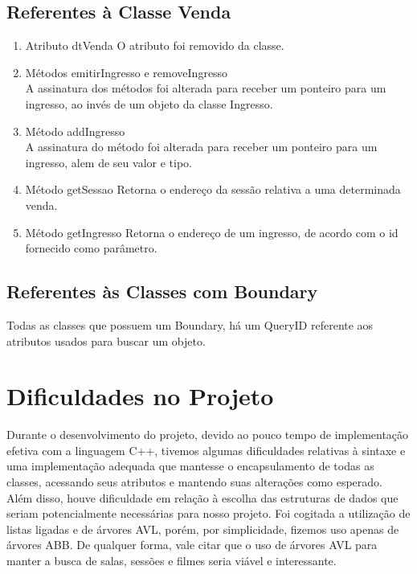 \documentclass[a4paper]{article}
\begin{document}
\subsection{Referentes à Classe Venda}
\begin{enumerate}

\item{Atributo dtVenda}
O atributo foi removido da classe.

\item{Métodos emitirIngresso e removeIngresso}\\
A assinatura dos métodos foi alterada para receber um ponteiro para um ingresso, ao invés de um objeto da classe Ingresso.

\item{Método addIngresso}\\
A assinatura do método foi alterada para receber um ponteiro para um ingresso, alem de seu valor e tipo.

\item{Método getSessao}
Retorna o endereço da sessão relativa a uma determinada venda.

\item{Método getIngresso}
Retorna o endereço de um ingresso, de acordo com o id fornecido como parâmetro.

\end{enumerate}

\subsection{Referentes às Classes com Boundary}
Todas as classes que possuem um Boundary, há um QueryID referente aos atributos usados para buscar um objeto.

\pagebreak

\section{Dificuldades no Projeto}
\hspace{5 mm}Durante o desenvolvimento do projeto, devido ao pouco tempo de implementação efetiva com a linguagem C++, tivemos algumas dificuldades relativas à sintaxe e uma implementação adequada que mantesse o encapsulamento de todas as classes, acessando seus atributos e mantendo suas alterações como esperado.\\

Além disso, houve dificuldade em relação à escolha das estruturas de dados que seriam potencialmente necessárias para nosso projeto. Foi cogitada a utilização de listas ligadas e de árvores AVL, porém, por simplicidade, fizemos uso apenas de árvores ABB. De qualquer forma, vale citar que o uso de árvores AVL para manter a busca de salas, sessões e filmes seria viável e interessante.
\end{document}

